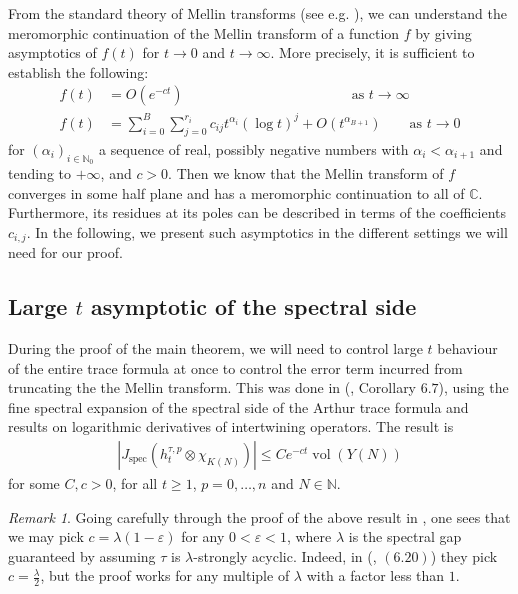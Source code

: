 \documentclass[11pt,reqno]{amsart}
\numberwithin{equation}{section}
\theoremstyle{definition}
\theoremstyle{remark}
\newtheorem{rmk}[thm]{Remark}
\newcommand{\N}{\mathbb{N}}
\newcommand{\vol}{\operatorname{vol}}
\newcommand{\C}{\mathbb{C}}
\renewcommand{\epsilon}{\varepsilon}
\begin{document}
From the standard theory of Mellin transforms (see e.g. \cite{Zagier}), we can understand the meromorphic continuation of the Mellin transform of a function $f$ by giving asymptotics of $f(t)$ for $t\to 0$ and $t\to\infty$. More precisely, it is sufficient to establish the following:
\begin{align}\label{largef}
    f(t) &= O(e^{-ct}) \qquad\qquad\qquad\qquad\qquad\qquad \text{as }t\to\infty \\\label{smalltf}
    f(t) &= \sum_{i=0}^B\sum_{j=0}^{r_i}c_{ij}t^{\alpha_i}(\log t)^j +O(t^{\alpha_{B+1}}) \qquad \text{as }t\to 0
\end{align}
for $(\alpha_i)_{i\in\N_0}$ a sequence of real, possibly negative numbers with $\alpha_i<\alpha_{i+1}$ and tending to $+\infty$, and $c>0$. Then we know that the Mellin transform of $f$ converges in some half plane and has a meromorphic continuation to all of $\C$. Furthermore, its residues at its poles can be described in terms of the coefficients $c_{i,j}$. In the following, we present such asymptotics in the different settings we will need for our proof.


\subsection*{Large $t$ asymptotic of the spectral side}

During the proof of the main theorem, we will need to control large $t$ behaviour of the entire trace formula at once to control the error term incurred from truncating the the Mellin transform. This was done in (\cite{MzM2}, Corollary $6.7$), using the fine spectral expansion of the spectral side of the Arthur trace formula and results on logarithmic derivatives of intertwining operators. The result is
\begin{align}\label{larget}
    \left\vert J_{\text{spec}}(h_t^{\tau,p}\otimes \chi_{K(N)})\right\vert \leq Ce^{-c t}\vol(Y(N))
\end{align}
for some $C,c>0$, for all $t\geq 1$, $p=0,\dots,n$ and $N\in\N$.
\begin{rmk}\label{rmkonconstant}
    Going carefully through the proof of the above result in \cite{MzM2}, one sees that we may pick $c=\lambda(1-\epsilon)$ for any $0<\epsilon<1$, where $\lambda$ is the spectral gap guaranteed by assuming $\tau$ is $\lambda$-strongly acyclic. Indeed, in  (\cite{MzM2}, $(6.20)$) they pick $c=\frac{\lambda}{2}$, but the proof works for any multiple of $\lambda$ with a factor less than $1$.  
\end{rmk} 
\end{document}
